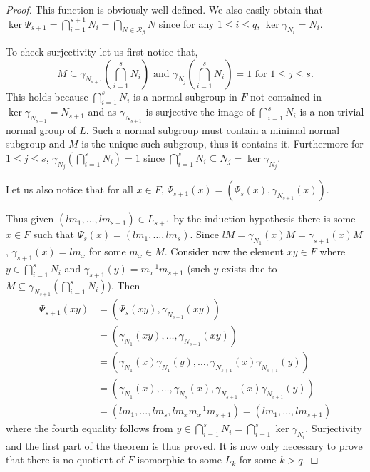 \begin{proof}
    This function is obviously well defined. 
    We also easily obtain that $\ker \Psi_{s+1} = \bigcap_{i=1}^{s+1} N_i =\bigcap_{N \in \mathscr{R}_\beta}N$ since for any $1 \le i \le q$, $\ker \gamma_{N_i} = N_i$.

    To check surjectivity let us first notice that, 
    $$M \subseteq \gamma_{N_{s+1}}(\bigcap_{i=1}^s N_i) \text{ and } \gamma_{N_{j}}(\bigcap_{i=1}^s N_i) = 1 \text{ for } 1 \le j \le s.$$ 
    This holds because $\bigcap_{i=1}^s N_i$ is a normal subgroup in $F$ not contained in $\ker \gamma_{N_{s+1}} = N_{s+1}$ and as $\gamma_{N_{s+1}}$ is surjective the image of $\bigcap_{i=1}^s N_i$ is a non-trivial normal group of $L$. 
    Such a normal subgroup must contain a minimal normal subgroup and $M$ is the unique such subgroup, thus it contains it. 
    Furthermore for $1 \le j \le s$, $\gamma_{N_j}(\bigcap_{i=1}^s N_i) = 1$ since $\bigcap_{i=1}^s N_i \subseteq N_j = \ker \gamma_{N_j}$. 
    
    Let us also notice that for all $x \in F$, $\Psi_{s+1}(x) = (\Psi_{s}(x), \gamma_{N_{s+1}}(x))$.

    Thus given $(lm_1, \ldots , lm_{s+1}) \in L_{s+1}$ by the induction hypothesis there is some $x \in F$ such that $\Psi_{s}(x) = (lm_1, \ldots , lm_s)$.
    Since $lM = \gamma_{N_1}(x)M = \gamma_{s+1}(x)M$, $\gamma_{s+1}(x) = lm_x$ for some $m_x \in M$. 
    Consider now the element $xy \in F$ where $y \in \bigcap_{i=1}^s N_i$ and $\gamma_{s+1}(y) = m_x^{-1}m_{s+1}$ (such $y$ exists due to $M \subseteq \gamma_{N_{s+1}}(\bigcap_{i=1}^s N_i)$).
    Then 
    \begin{align*}
        \Psi_{s+1}(xy) &=  (\Psi_{s}(xy), \gamma_{N_{s+1}}(xy)) \\ 
        &= (\gamma_{N_1}(xy), \ldots , \gamma_{N_{s+1}}(xy)) \\
        &= (\gamma_{N_1}(x)\gamma_{N_1}(y), \ldots , \gamma_{N_{s+1}}(x)\gamma_{N_{s+1}}(y)) \\
        &= (\gamma_{N_1}(x), \ldots ,\gamma_{N_s}(x), \gamma_{N_{s+1}}(x)\gamma_{N_{s+1}}(y)) \\
        &= (lm_1, \ldots ,lm_s, lm_xm_x^{-1}m_{s+1}) = (lm_1, \ldots , lm_{s+1}) 
    \end{align*}
    where the fourth equality follows from $y \in \bigcap_{i=1}^s N_i = \bigcap_{i = 1}^s \ker \gamma_{N_i}$. Surjectivity and the first part of the theorem is thus proved. It is now only necessary to prove that there is no quotient of $F$ isomorphic to some $L_k$ for some $k > q$.


\end{proof}
